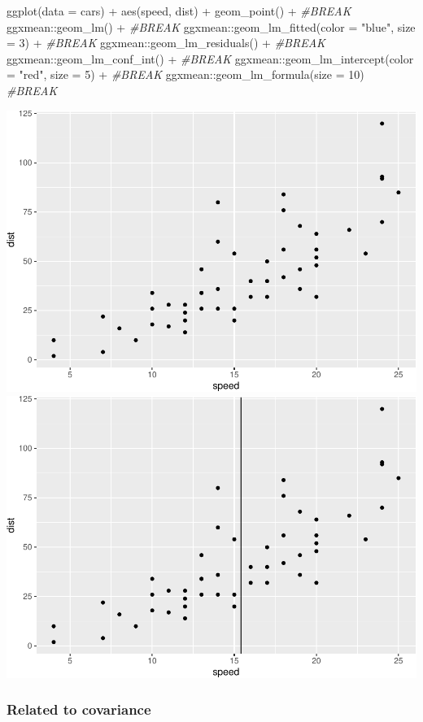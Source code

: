 \documentclass[12pt]{article}
\newenvironment{Shaded}{\begin{snugshade}}{\end{snugshade}}
\newcommand{\AttributeTok}[1]{\textcolor[rgb]{0.77,0.63,0.00}{#1}}
\newcommand{\CommentTok}[1]{\textcolor[rgb]{0.56,0.35,0.01}{\textit{#1}}}
\newcommand{\DecValTok}[1]{\textcolor[rgb]{0.00,0.00,0.81}{#1}}
\newcommand{\FunctionTok}[1]{\textcolor[rgb]{0.00,0.00,0.00}{#1}}
\newcommand{\NormalTok}[1]{#1}
\newcommand{\SpecialCharTok}[1]{\textcolor[rgb]{0.00,0.00,0.00}{#1}}
\newcommand{\StringTok}[1]{\textcolor[rgb]{0.31,0.60,0.02}{#1}}
\begin{document}
\begin{Shaded}
\begin{Highlighting}[]
\FunctionTok{ggplot}\NormalTok{(}\AttributeTok{data =}\NormalTok{ cars) }\SpecialCharTok{+} 
  \FunctionTok{aes}\NormalTok{(speed, dist) }\SpecialCharTok{+} 
  \FunctionTok{geom\_point}\NormalTok{() }\SpecialCharTok{+} \CommentTok{\#BREAK}
\NormalTok{  ggxmean}\SpecialCharTok{::}\FunctionTok{geom\_lm}\NormalTok{() }\SpecialCharTok{+} \CommentTok{\#BREAK}
\NormalTok{  ggxmean}\SpecialCharTok{::}\FunctionTok{geom\_lm\_fitted}\NormalTok{(}\AttributeTok{color =} \StringTok{"blue"}\NormalTok{,}
                          \AttributeTok{size =} \DecValTok{3}\NormalTok{) }\SpecialCharTok{+} \CommentTok{\#BREAK}
\NormalTok{  ggxmean}\SpecialCharTok{::}\FunctionTok{geom\_lm\_residuals}\NormalTok{() }\SpecialCharTok{+} \CommentTok{\#BREAK}
\NormalTok{  ggxmean}\SpecialCharTok{::}\FunctionTok{geom\_lm\_conf\_int}\NormalTok{() }\SpecialCharTok{+} \CommentTok{\#BREAK}
\NormalTok{  ggxmean}\SpecialCharTok{::}\FunctionTok{geom\_lm\_intercept}\NormalTok{(}\AttributeTok{color =} \StringTok{"red"}\NormalTok{,}
                             \AttributeTok{size =} \DecValTok{5}\NormalTok{) }\SpecialCharTok{+} \CommentTok{\#BREAK}
\NormalTok{  ggxmean}\SpecialCharTok{::}\FunctionTok{geom\_lm\_formula}\NormalTok{(}\AttributeTok{size =} \DecValTok{10}\NormalTok{) }\CommentTok{\#BREAK}
\end{Highlighting}
\end{Shaded}

\begin{center}\includegraphics[width=0.3\linewidth]{manuscript_files/figure-latex/unnamed-chunk-7-1} \includegraphics[width=0.3\linewidth]{manuscript_files/figure-latex/unnamed-chunk-7-2} \end{center}

\hypertarget{related-to-covariance}{%
\subsubsection{Related to covariance}\label{related-to-covariance}}
\end{document}
